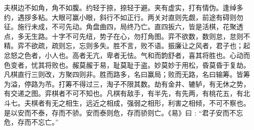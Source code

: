 \documentclass[]{article}
\begin{document}
夫棋边不如角，角不如腹。约轻于捺，捺轻于避。夹有虚实，打有情伪。逢绰多约，遇拶多粘。大眼可赢小眼，斜行不如正行。两关对直则先觑，前途有碍则勿征。施行未成，不可先动。角盘曲四，局终乃亡。直四扳六，皆是活棋，花聚透点，多无生路。十字不可先纽，势子在心，勿打角图。弈不欲数，数则怠，怠则不精。弈不欲疏，疏则忘，忘则多失。胜不言，败不语。振廉让之风者，君子也；起忿怒之色者，小人也。高者无亢，卑者无怯。气和而韵舒者，喜其将胜也。心动而色变者，忧其将败也。赧莫赧于易，耻莫耻于盗。妙莫妙于用松，昏莫昏于复劫。凡棋直行三则改，方聚四则非。胜而路多，名曰赢局；败而无路，名曰输筹。皆筹为溢，停路为芇。打筹不得过三，淘子不限其数。劫有金井、辘轳，有无休之势，有交递之图。弈棋者不可不知也。凡棋有敌手，有半先，有先两，有桃花五，有北斗七。夫棋者有无之相生，远近之相成，强弱之相形，利害之相倾，不可不察也。是以安而不泰，存而不骄。安而泰则危，存而骄则亡。《易》曰﹕``君子安而不忘危，存而不忘亡。''
\end{document}
